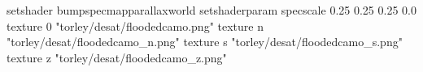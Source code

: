 setshader bumpspecmapparallaxworld
setshaderparam specscale 0.25 0.25 0.25 0.0
texture 0 "torley/desat/floodedcamo.png"
texture n "torley/desat/floodedcamo_n.png"
texture s "torley/desat/floodedcamo_s.png"
texture z "torley/desat/floodedcamo_z.png"

